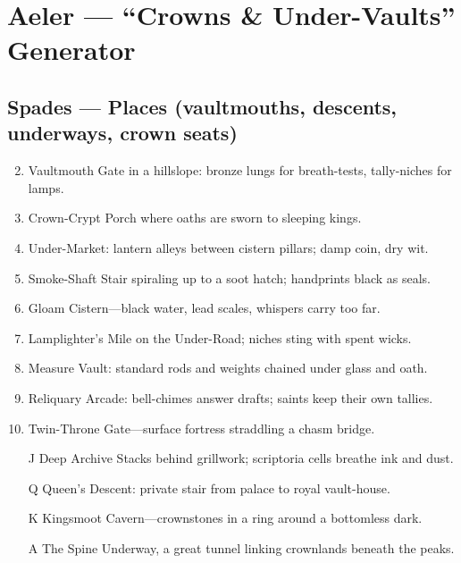 \chapter{Aeler --- ``Crowns \& Under-Vaults'' Generator}

\section*{Spades --- Places (vaultmouths, descents, underways, crown seats)}
\begin{enumerate}
\setcounter{enumi}{1}
\item Vaultmouth Gate in a hillslope: bronze lungs for breath-tests, tally-niches for lamps.
\item Crown-Crypt Porch where oaths are sworn to sleeping kings.
\item Under-Market: lantern alleys between cistern pillars; damp coin, dry wit.
\item Smoke-Shaft Stair spiraling up to a soot hatch; handprints black as seals.
\item Gloam Cistern---black water, lead scales, whispers carry too far.
\item Lamplighter's Mile on the Under-Road; niches sting with spent wicks.
\item Measure Vault: standard rods and weights chained under glass and oath.
\item Reliquary Arcade: bell-chimes answer drafts; saints keep their own tallies.
\item Twin-Throne Gate---surface fortress straddling a chasm bridge.
\item[J] Deep Archive Stacks behind grillwork; scriptoria cells breathe ink and dust.
\item[Q] Queen's Descent: private stair from palace to royal vault-house.
\item[K] Kingsmoot Cavern---crownstones in a ring around a bottomless dark.
\item[A] The Spine Underway, a great tunnel linking crownlands beneath the peaks.
\end{enumerate}

